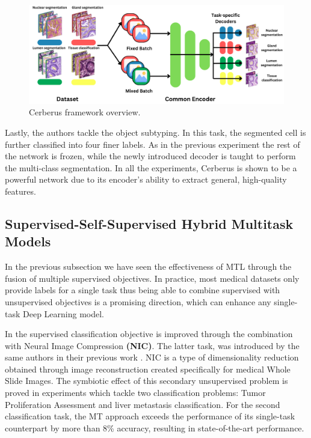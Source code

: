 \documentclass[conference]{IEEEtran}
\begin{document}
\begin{figure}[htb]
    \centering
	\centerline{\includegraphics[scale=0.6]{figures/12_2_V3.png}}
	\caption{Cerberus \cite{graham2023one} framework overview.}
	\label{cerberus}
\end{figure}

Lastly, the authors tackle the object subtyping. In this task, the segmented cell is further classified into four finer labels. As in the previous experiment the rest of the network is frozen, while the newly introduced decoder is taught to perform the multi-class segmentation. In all the experiments, Cerberus is shown to be a powerful network due to its encoder's ability to extract general, high-quality features.

\subsection{Supervised-Self-Supervised Hybrid Multitask Models}
\label{ssshmm}

In the previous subsection we have seen the effectiveness of MTL through the fusion of multiple supervised objectives. In practice, most medical datasets only provide labels for a single task thus being able to combine supervised with unsupervised objectives is a promising direction, which can enhance any single-task Deep Learning model. 

In \cite{tellez2020extending} the supervised classification objective is improved through the combination with Neural Image Compression \textbf{(NIC)}. The latter task, was introduced by the same authors in their previous work \cite{tellez2019neural}. NIC is a type of dimensionality reduction obtained through image reconstruction created specifically for medical Whole Slide Images. The symbiotic effect of this secondary unsupervised problem is proved in experiments which tackle two classification problems: Tumor Proliferation Assessment and  liver metastasis classification. For the second classification task, the MT approach exceeds the performance of its single-task counterpart by more than 8\% accuracy, resulting in state-of-the-art performance. 
\end{document}
